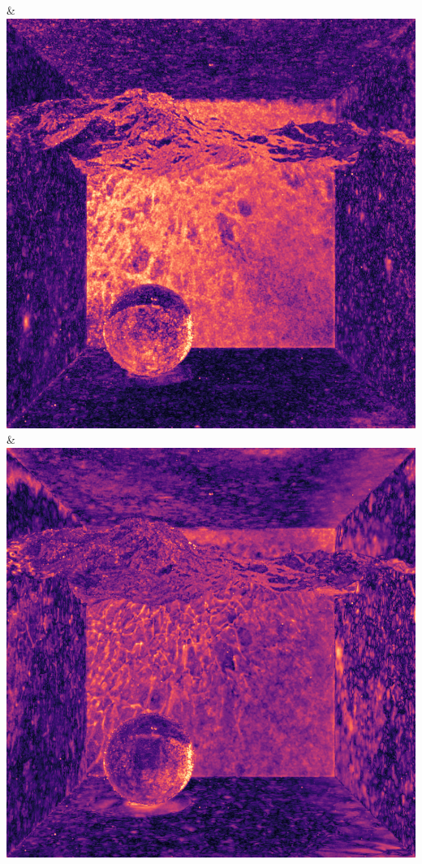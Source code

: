 & \includegraphics[width=\linewidth]{figures/py/tests/sppc_optimization/nrc+sppc+Rej70+RejN_1spp_caustics_small_flip.png}
& \includegraphics[width=\linewidth]{figures/py/tests/sppc_optimization/nrc+sppc14@1_1spp_caustics_small_flip.png}

